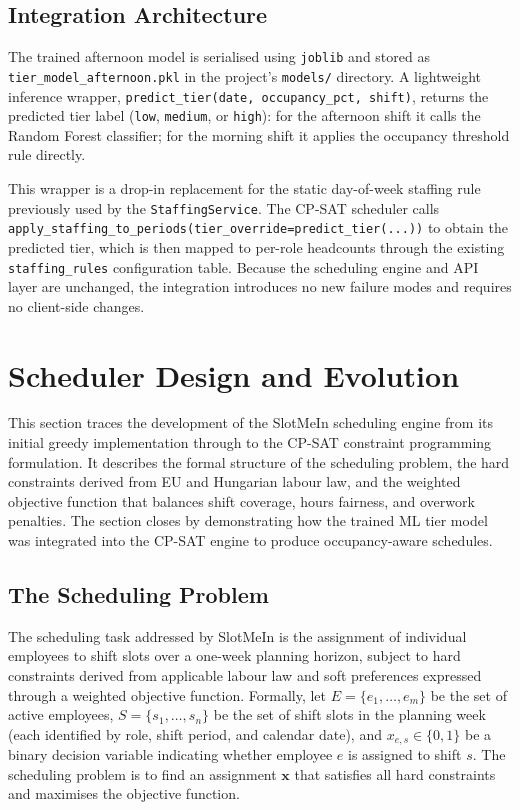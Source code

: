 \documentclass[12pt,a4paper,oneside]{article}
\begin{document}
\subsection{Integration Architecture}

The trained afternoon model is serialised using \texttt{joblib} and stored as \texttt{tier\_model\_afternoon.pkl} in the project's \texttt{models/} directory. A lightweight inference wrapper, \texttt{predict\_tier(date, occupancy\_pct, shift)}, returns the predicted tier label (\texttt{low}, \texttt{medium}, or \texttt{high}): for the afternoon shift it calls the Random Forest classifier; for the morning shift it applies the occupancy threshold rule directly.

This wrapper is a drop-in replacement for the static day-of-week staffing rule previously used by the \texttt{StaffingService}. The CP-SAT scheduler calls \texttt{apply\_staffing\_to\_periods(tier\_override=predict\_tier(...))} to obtain the predicted tier, which is then mapped to per-role headcounts through the existing \texttt{staffing\_rules} configuration table. Because the scheduling engine and API layer are unchanged, the integration introduces no new failure modes and requires no client-side changes.


\section{Scheduler Design and Evolution}
\label{sec:scheduler}

This section traces the development of the SlotMeIn scheduling engine from its initial greedy implementation through to the CP-SAT constraint programming formulation. It describes the formal structure of the scheduling problem, the hard constraints derived from EU and Hungarian labour law, and the weighted objective function that balances shift coverage, hours fairness, and overwork penalties. The section closes by demonstrating how the trained ML tier model was integrated into the CP-SAT engine to produce occupancy-aware schedules.

\subsection{The Scheduling Problem}

The scheduling task addressed by SlotMeIn is the assignment of individual employees to shift slots over a one-week planning horizon, subject to hard constraints derived from applicable labour law and soft preferences expressed through a weighted objective function. Formally, let $E = \{e_1, \ldots, e_m\}$ be the set of active employees, $S = \{s_1, \ldots, s_n\}$ be the set of shift slots in the planning week (each identified by role, shift period, and calendar date), and $x_{e,s} \in \{0, 1\}$ be a binary decision variable indicating whether employee $e$ is assigned to shift $s$. The scheduling problem is to find an assignment $\mathbf{x}$ that satisfies all hard constraints and maximises the objective function.
\end{document}
